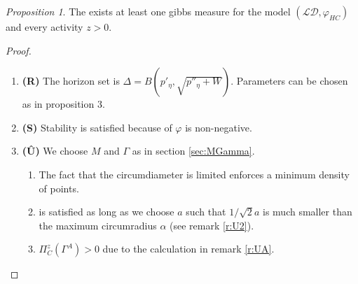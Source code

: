 \documentclass[12pt,a4paper]{article}
\theoremstyle{definition}
\theoremstyle{remark}
\theoremstyle{theorem}
\newtheorem{proposition}{Proposition}
\begin{document}
\begin{proposition}
	The exists at least one gibbs measure for the model $(\mathcal {LD},\varphi_{HC})$ and every activity $z>0$.
\end{proposition}
\begin{proof}
\begin{enumerate}[]
	\item \textbf{(R)} The horizon set is $\Delta = B(p'_\eta,\sqrt{p''_\eta +W})$. Parameters can be chosen as in proposition 3. 
	\item \textbf{(S)} Stability is satisfied because of $\varphi$ is non-negative.
	\item \textbf{(\^{U})} We choose $M$ and $\Gamma$ as in section \ref{sec:MGamma}.
		\begin{enumerate}[(\^{U}1)]
			\item {} The fact that the circumdiameter is limited enforces a minimum density of points.
			\item {} is satisfied as long as we choose $a$ such that $1/\sqrt{2} a$ is much smaller than the maximum circumradius $\alpha$ (see remark \ref{r:U2}).
			\item $\Pi^z_C(\Gamma^A) >0$ due to the calculation in remark \ref{r:UA}.
		\end{enumerate}
\end{enumerate}
\end{proof}





\listoftodos
\end{document}
